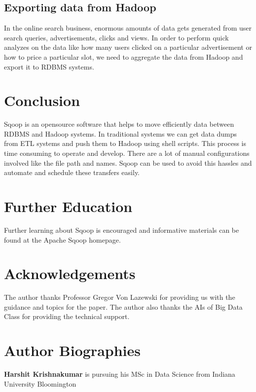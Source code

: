 \documentclass[9pt,twocolumn,twoside]{styles/osajnl}
\begin{document}
\subsection{Exporting data from Hadoop}
In the online search business, enormous amounts of data gets generated from user search queries, advertisements, clicks and views. In order to perform quick analyzes on the data like how many users clicked on a particular advertisement or how to price a particular slot, we need to aggregate the data from Hadoop and export it to RDBMS systems. 

\section{Conclusion}
Sqoop is an opensource software that helps to move efficiently data between RDBMS and Hadoop systems. In traditional systems we can get data dumps from ETL systems and push them to Hadoop using shell scripts. This process is time consuming to operate and develop. There are a lot of manual configurations involved like the file path and names. Sqoop can be used to avoid this hassles and automate and schedule these transfers easily. 

\section{Further Education}
Further learning about Sqoop is encouraged and informative materials can be found at the Apache Sqoop homepage\cite{pages}.

\section*{Acknowledgements}

The author thanks Professor Gregor Von Lazewski for providing us with the guidance and topics for the paper. The author also thanks the AIs of Big Data Class for providing the technical
support.




 
\section*{Author Biographies}
\begingroup
\setlength\intextsep{0pt}
\begin{minipage}[t][3.2cm][t]{1.0\columnwidth} %
{\bfseries Harshit Krishnakumar} is pursuing his MSc in Data Science from
Indiana University Bloomington
\end{minipage}
\endgroup
\end{document}
